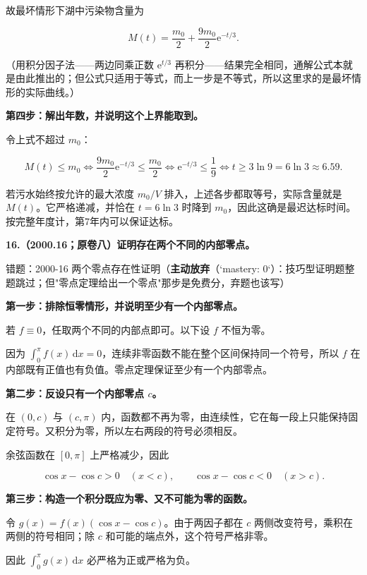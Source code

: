 \documentclass[UTF8,11pt,fontset=windows]{ctexart}
\begin{document}
故最坏情形下湖中污染物含量为

$$
M(t)=\frac{m_0}2+\frac{9m_0}2\mathrm e^{-t/3}.
$$

（用积分因子法——两边同乘正数 $\mathrm e^{t/3}$ 再积分——结果完全相同，通解公式本就是由此推出的；但公式只适用于等式，而上一步是不等式，所以这里求的是最坏情形的实际曲线。）

\textbf{第四步：解出年数，并说明这个上界能取到。}

令上式不超过 $m_0$：

$$
M(t)\le m_0
\iff \frac{9m_0}2\mathrm e^{-t/3}\le\frac{m_0}2
\iff \mathrm e^{-t/3}\le\frac19
\iff t\ge3\ln9=6\ln3\approx6.59.
$$

若污水始终按允许的最大浓度 $m_0/V$ 排入，上述各步都取等号，实际含量就是 $M(t)$。它严格递减，并恰在 $t=6\ln3$ 时降到 $m_0$，因此这确是最迟达标时间。按完整年度计，第7年内可以保证达标。

\clearpage

\textbf{16.（2000.16；原卷八）证明存在两个不同的内部零点。}

\begingroup\color{gray}错题：2000-16 两个零点存在性证明（\textbf{主动放弃}（`mastery: 0`）：技巧型证明题整题跳过；但"零点定理给出一个零点"那步是免费分，弃题也该写）\par\endgroup

\textbf{第一步：排除恒零情形，并说明至少有一个内部零点。}

若 $f\equiv0$，任取两个不同的内部点即可。以下设 $f$ 不恒为零。

因为 $\int_0^\pi f(x)\,\mathrm dx=0$，连续非零函数不能在整个区间保持同一个符号，所以 $f$ 在内部既有正值也有负值。零点定理保证至少有一个内部零点。

\textbf{第二步：反设只有一个内部零点 $c$。}

在 $(0,c)$ 与 $(c,\pi)$ 内，函数都不再为零，由连续性，它在每一段上只能保持固定符号。又积分为零，所以左右两段的符号必须相反。

余弦函数在 $[0,\pi]$ 上严格减少，因此

$$
\cos x-\cos c>0\quad(x<c),\qquad
\cos x-\cos c<0\quad(x>c).
$$

\textbf{第三步：构造一个积分既应为零、又不可能为零的函数。}

令 $g(x)=f(x)(\cos x-\cos c)$。由于两因子都在 $c$ 两侧改变符号，乘积在两侧的符号相同；除 $c$ 和可能的端点外，这个符号严格非零。

因此 $\int_0^\pi g(x)\,\mathrm dx$ 必严格为正或严格为负。
\end{document}

